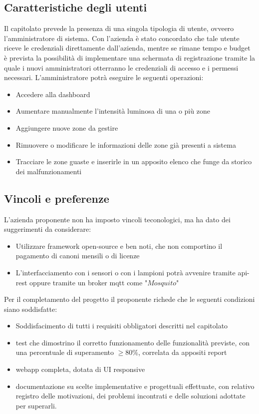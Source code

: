 \documentclass[12pt]{article}
\begin{document}
\subsection{Caratteristiche degli utenti}
Il capitolato prevede la presenza di una singola tipologia di utente, ovveero l'amministratore di sistema. Con l'azienda è stato concordato che tale utente riceve le credenziali direttamente dall'azienda, mentre se rimane tempo e budget è prevista la possibilità di implementare una schermata di registrazione tramite la quale i nuovi amministratori otterranno le credenziali di accesso e i permessi necessari.
L'amministratore potrà eseguire le seguenti operazioni:
\begin{itemize}
	\item Accedere alla dashboard
	\item Aumentare manualmente l'intensità luminosa di una o più zone
	\item Aggiungere nuove zone da gestire
	\item Rimuovere o modificare le informazioni delle zone già presenti a sistema
	\item Tracciare le zone guaste e inserirle in un apposito elenco che funge da storico dei malfunzionamenti
\end{itemize}

\subsection{Vincoli e preferenze}
L'azienda proponente non ha imposto vincoli teconologici, ma ha dato dei suggerimenti da considerare:
\begin{itemize}
	\item Utilizzare framework open-source e ben noti, che non comportino il pagamento di canoni mensili o di licenze
	\item L'interfacciamento con i sensori o con i lampioni potrà avvenire tramite api-rest oppure tramite un broker mqtt come "$Mosquito$"
\end{itemize}

Per il completamento del progetto il proponente richede che le seguenti condizioni siano soddisfatte:
\begin{itemize}
	\item Soddisfacimento di tutti i requisiti obbligatori descritti nel capitolato
	\item test che dimostrino il corretto funzionamento delle funzionalità previste, con una percentuale di superamento \begin{math}\geq 80\% \end{math}, correlata da appositi report
	\item  webapp completa, dotata di UI responsive
	\item documentazione su scelte implementative e progettuali effettuate, con relativo registro delle motivazioni, dei problemi incontrati e delle soluzioni adottate per superarli.
\end{itemize}
\end{document}
